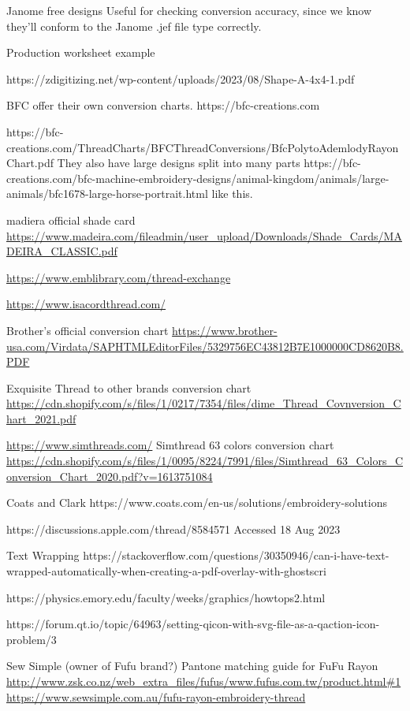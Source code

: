 \documentclass[10pt]{report}
\begin{document}
Janome free designs %
Useful for checking conversion accuracy, since we know they'll conform to the
Janome .jef file type correctly.

Production worksheet example

https://zdigitizing.net/wp-content/uploads/2023/08/Shape-A-4x4-1.pdf

BFC offer their own conversion charts.
https://bfc-creations.com

https://bfc-creations.com/ThreadCharts/BFCThreadConversions/BfcPolytoAdemlodyRayonChart.pdf
They also have large designs split into many parts
https://bfc-creations.com/bfc-machine-embroidery-designs/animal-kingdom/animals/large-animals/bfc1678-large-horse-portrait.html
like this.

madiera official shade card
\url{https://www.madeira.com/fileadmin/user_upload/Downloads/Shade_Cards/MADEIRA_CLASSIC.pdf}

\url{https://www.emblibrary.com/thread-exchange}

\url{https://www.isacordthread.com/}

Brother's official conversion chart
\url{https://www.brother-usa.com/Virdata/SAPHTMLEditorFiles/5329756EC43812B7E1000000CD8620B8.PDF}

Exquisite Thread to other brands conversion chart
\url{https://cdn.shopify.com/s/files/1/0217/7354/files/dime_Thread_Covnversion_Chart_2021.pdf}

\url{https://www.simthreads.com/}
Simthread 63 colors conversion chart
\url{https://cdn.shopify.com/s/files/1/0095/8224/7991/files/Simthread_63_Colors_Conversion_Chart_2020.pdf?v=1613751084}

Coats and Clark https://www.coats.com/en-us/solutions/embroidery-solutions

https://discussions.apple.com/thread/8584571 Accessed 18 Aug 2023

Text Wrapping
https://stackoverflow.com/questions/30350946/can-i-have-text-wrapped-automatically-when-creating-a-pdf-overlay-with-ghostscri

https://physics.emory.edu/faculty/weeks/graphics/howtops2.html

https://forum.qt.io/topic/64963/setting-qicon-with-svg-file-as-a-qaction-icon-problem/3

Sew Simple (owner of Fufu brand?) Pantone matching guide for FuFu Rayon
\url{http://www.zsk.co.nz/web_extra_files/fufus/www.fufus.com.tw/product.html#1}
\url{https://www.sewsimple.com.au/fufu-rayon-embroidery-thread}
\end{document}
